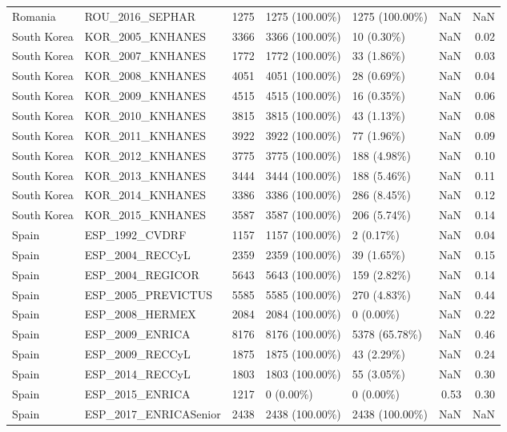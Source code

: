 \begin{longtable}{llrllrr}
Romania & ROU\_2016\_SEPHAR & 1275 & 1275 (100.00\%) & 1275 (100.00\%) & NaN & NaN\\
\addlinespace
South Korea & KOR\_2005\_KNHANES & 3366 & 3366 (100.00\%) & 10 (0.30\%) & NaN & 0.02\\
South Korea & KOR\_2007\_KNHANES & 1772 & 1772 (100.00\%) & 33 (1.86\%) & NaN & 0.03\\
South Korea & KOR\_2008\_KNHANES & 4051 & 4051 (100.00\%) & 28 (0.69\%) & NaN & 0.04\\
South Korea & KOR\_2009\_KNHANES & 4515 & 4515 (100.00\%) & 16 (0.35\%) & NaN & 0.06\\
South Korea & KOR\_2010\_KNHANES & 3815 & 3815 (100.00\%) & 43 (1.13\%) & NaN & 0.08\\
South Korea & KOR\_2011\_KNHANES & 3922 & 3922 (100.00\%) & 77 (1.96\%) & NaN & 0.09\\
South Korea & KOR\_2012\_KNHANES & 3775 & 3775 (100.00\%) & 188 (4.98\%) & NaN & 0.10\\
South Korea & KOR\_2013\_KNHANES & 3444 & 3444 (100.00\%) & 188 (5.46\%) & NaN & 0.11\\
South Korea & KOR\_2014\_KNHANES & 3386 & 3386 (100.00\%) & 286 (8.45\%) & NaN & 0.12\\
South Korea & KOR\_2015\_KNHANES & 3587 & 3587 (100.00\%) & 206 (5.74\%) & NaN & 0.14\\
\addlinespace
Spain & ESP\_1992\_CVDRF & 1157 & 1157 (100.00\%) & 2 (0.17\%) & NaN & 0.04\\
Spain & ESP\_2004\_RECCyL & 2359 & 2359 (100.00\%) & 39 (1.65\%) & NaN & 0.15\\
Spain & ESP\_2004\_REGICOR & 5643 & 5643 (100.00\%) & 159 (2.82\%) & NaN & 0.14\\
Spain & ESP\_2005\_PREVICTUS & 5585 & 5585 (100.00\%) & 270 (4.83\%) & NaN & 0.44\\
Spain & ESP\_2008\_HERMEX & 2084 & 2084 (100.00\%) & 0 (0.00\%) & NaN & 0.22\\
Spain & ESP\_2009\_ENRICA & 8176 & 8176 (100.00\%) & 5378 (65.78\%) & NaN & 0.46\\
Spain & ESP\_2009\_RECCyL & 1875 & 1875 (100.00\%) & 43 (2.29\%) & NaN & 0.24\\
Spain & ESP\_2014\_RECCyL & 1803 & 1803 (100.00\%) & 55 (3.05\%) & NaN & 0.30\\
Spain & ESP\_2015\_ENRICA & 1217 & 0 (0.00\%) & 0 (0.00\%) & 0.53 & 0.30\\
Spain & ESP\_2017\_ENRICASenior & 2438 & 2438 (100.00\%) & 2438 (100.00\%) & NaN & NaN\\

\end{longtable}
